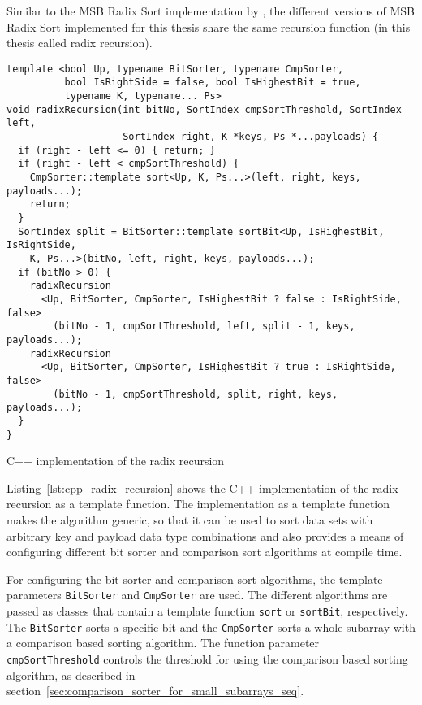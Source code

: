 \documentclass[12pt, a4paper, openright, twoside]{tiarbeit}
\begin{document}
Similar to the MSB Radix Sort implementation by \citet{moeller_radix},
the different versions of MSB Radix Sort implemented for this thesis share
the same recursion function (in this thesis called radix recursion).

\begin{listing}[h]
  \begin{verbatim}
template <bool Up, typename BitSorter, typename CmpSorter,
          bool IsRightSide = false, bool IsHighestBit = true,
          typename K, typename... Ps>
void radixRecursion(int bitNo, SortIndex cmpSortThreshold, SortIndex left,
                    SortIndex right, K *keys, Ps *...payloads) {
  if (right - left <= 0) { return; }
  if (right - left < cmpSortThreshold) {
    CmpSorter::template sort<Up, K, Ps...>(left, right, keys, payloads...);
    return;
  }
  SortIndex split = BitSorter::template sortBit<Up, IsHighestBit, IsRightSide,
    K, Ps...>(bitNo, left, right, keys, payloads...);
  if (bitNo > 0) {
    radixRecursion
      <Up, BitSorter, CmpSorter, IsHighestBit ? false : IsRightSide, false>
        (bitNo - 1, cmpSortThreshold, left, split - 1, keys, payloads...);
    radixRecursion
      <Up, BitSorter, CmpSorter, IsHighestBit ? true : IsRightSide, false>
        (bitNo - 1, cmpSortThreshold, split, right, keys, payloads...);
  }
}
  \end{verbatim}
  \caption{C++ implementation of the radix recursion}
  \label{lst:cpp_radix_recursion}
\end{listing}

Listing~\ref{lst:cpp_radix_recursion} shows the C++ implementation of the
radix recursion as a template function. The implementation as a template
function makes the algorithm generic, so that it can be used to sort data sets
with arbitrary key and payload data type combinations and also
provides a means of configuring different bit sorter and comparison
sort algorithms at compile time.

For configuring the bit sorter and comparison sort algorithms, the template
parameters \texttt{BitSorter} and \texttt{CmpSorter} are used.
The different algorithms are passed as classes that contain a template
function \texttt{sort} or \texttt{sortBit}, respectively.
The \texttt{BitSorter} sorts a specific bit
and the \texttt{CmpSorter} sorts a whole subarray
with a comparison based sorting algorithm. The function parameter
\texttt{cmpSortThreshold} controls the threshold for using the comparison
based sorting algorithm, as described in section~\ref{sec:comparison_sorter_for_small_subarrays_seq}.
\end{document}
